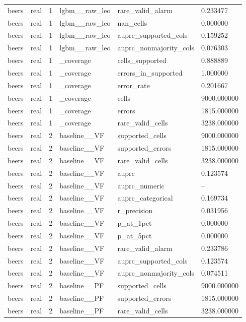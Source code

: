 \begin{tabular}{llllll}
beers & real & 1 & lgbm\_\_raw\_leo & rare\_valid\_alarm & 0.233477 \\
beers & real & 1 & lgbm\_\_raw\_leo & nan\_cells & 0.000000 \\
beers & real & 1 & lgbm\_\_raw\_leo & auprc\_supported\_cols & 0.159252 \\
beers & real & 1 & lgbm\_\_raw\_leo & auprc\_nonmajority\_cols & 0.076303 \\
beers & real & 1 & \_coverage & cells\_supported & 0.888889 \\
beers & real & 1 & \_coverage & errors\_in\_supported & 1.000000 \\
beers & real & 1 & \_coverage & error\_rate & 0.201667 \\
beers & real & 1 & \_coverage & cells & 9000.000000 \\
beers & real & 1 & \_coverage & errors & 1815.000000 \\
beers & real & 1 & \_coverage & rare\_valid\_cells & 3238.000000 \\
beers & real & 2 & baseline\_\_VF & supported\_cells & 9000.000000 \\
beers & real & 2 & baseline\_\_VF & supported\_errors & 1815.000000 \\
beers & real & 2 & baseline\_\_VF & rare\_valid\_cells & 3238.000000 \\
beers & real & 2 & baseline\_\_VF & auprc & 0.123574 \\
beers & real & 2 & baseline\_\_VF & auprc\_numeric & -- \\
beers & real & 2 & baseline\_\_VF & auprc\_categorical & 0.169734 \\
beers & real & 2 & baseline\_\_VF & r\_precision & 0.031956 \\
beers & real & 2 & baseline\_\_VF & p\_at\_1pct & 0.000000 \\
beers & real & 2 & baseline\_\_VF & p\_at\_5pct & 0.000000 \\
beers & real & 2 & baseline\_\_VF & rare\_valid\_alarm & 0.233786 \\
beers & real & 2 & baseline\_\_VF & auprc\_supported\_cols & 0.123574 \\
beers & real & 2 & baseline\_\_VF & auprc\_nonmajority\_cols & 0.074511 \\
beers & real & 2 & baseline\_\_PF & supported\_cells & 9000.000000 \\
beers & real & 2 & baseline\_\_PF & supported\_errors & 1815.000000 \\
beers & real & 2 & baseline\_\_PF & rare\_valid\_cells & 3238.000000 \\

\end{tabular}
